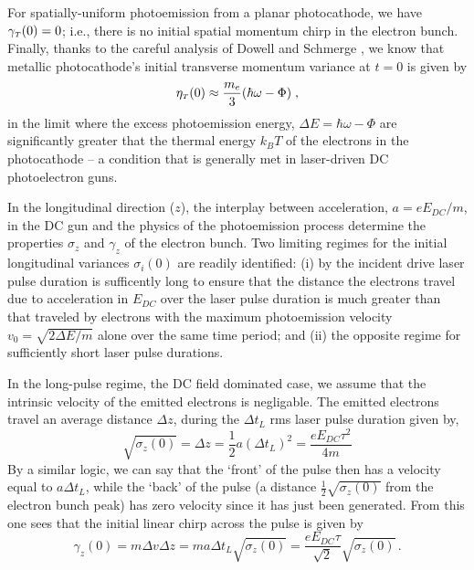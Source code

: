 For spatially-uniform photoemission from a planar photocathode, we have $ \gamma_{{\scriptscriptstyle T}} ( 0 ) = 0 $; i.e., there is no initial spatial momentum chirp in the electron bunch.
Finally, thanks to the careful analysis of Dowell and Schmerge \cite{dowell_quantum_2009}, we know that metallic photocathode's initial transverse momentum variance at $ t = 0 $ is given by
\begin{equation} \label{eq:jensen_eta}
  \eta_{ {\scriptscriptstyle T} } ( 0 ) \approx \frac{ m_{e} }{ 3 } ( \hbar \omega - \Phi ) \; \text{,}
\end{equation}
in the limit where the excess photoemission energy, $ \Delta E = \hbar \omega - \Phi $ are significantly greater that the thermal energy $ k_{B} T $ of the electrons in the photocathode -- a condition that is generally met in laser-driven DC photoelectron guns.

In the longitudinal direction ($z$), the interplay between acceleration, $ a = e E_{DC}/m $, in the DC gun and the physics of the photoemission process determine the properties $\sigma_z$ and $\gamma_z$ of the electron bunch.
Two limiting regimes for the initial longitudinal variances $ \sigma_{i} ( 0 ) $ are readily identified: (i) by the incident drive laser pulse duration is sufficently long to ensure that the distance the electrons travel due to acceleration in $ E_{DC} $ over the laser pulse duration is much greater than that traveled by electrons with the maximum photoemission velocity $ v_{0} = \sqrt{ 2 \Delta E / m } $ alone over the same time period; and (ii) the opposite regime for sufficiently short laser pulse durations.

In the long-pulse regime, the DC field dominated case, we assume that the intrinsic velocity of the emitted electrons is negligable.
The emitted electrons travel an average distance $ \Delta z $, during the $ \Delta t_{ L } $ rms laser pulse duration given by,
\begin{equation}
  \sqrt{ \sigma_{ z } ( 0 ) } = \Delta z = \frac{ 1 }{ 2 } a ( \Delta t_{L} )^{ 2 }  = \frac{ e E_{ DC } \tau^{ 2 } }{ 4 m }
\end{equation}
By a similar logic, we can say that the `front' of the pulse then has a velocity equal to $ a \Delta t_{ L } $, while the `back' of the pulse (a distance $ \frac{ 1 }{ 2 } \sqrt{ \sigma_{ z } ( 0 ) } $ from the electron bunch peak) has zero velocity since it has just been generated. From this one sees that the initial linear chirp across the pulse is given by 
\begin{equation}
  \gamma_{ z } ( 0 ) = m \Delta v \Delta z = m a \Delta t_{ L } \sqrt{ \sigma_{ z } ( 0 ) } = \frac{ e E_{ DC } \tau }{ \sqrt{ 2 } }\sqrt{ \sigma_{ z } ( 0 ) }\, .
\end{equation} 

